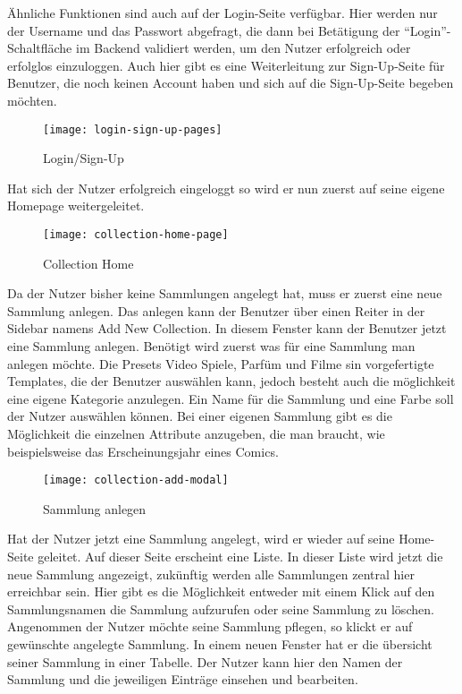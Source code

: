 Ähnliche Funktionen sind auch auf der Login-Seite verfügbar.
Hier werden nur der Username und das Passwort abgefragt, die dann bei Betätigung der “Login”-Schaltfläche im Backend validiert werden, um den Nutzer erfolgreich oder erfolglos einzuloggen.
Auch hier gibt es eine Weiterleitung zur Sign-Up-Seite für Benutzer, die noch keinen Account haben und sich auf die Sign-Up-Seite begeben möchten.

\begin{figure}[h]
    \centering
    \texttt{[image: login-sign-up-pages]}
    \caption{Login/Sign-Up}
    \label{fig:login-sign-up-pages}
\end{figure}

Hat sich der Nutzer erfolgreich eingeloggt so wird er nun zuerst auf seine eigene Homepage weitergeleitet.

\begin{figure}[h]
    \centering
    \texttt{[image: collection-home-page]}
    \caption{Collection Home}
    \label{fig:collection-home-page}
\end{figure}

Da der Nutzer bisher keine Sammlungen angelegt hat, muss er zuerst eine neue Sammlung anlegen.
Das anlegen kann der Benutzer über einen Reiter in der Sidebar namens Add New Collection.
In diesem Fenster kann der Benutzer jetzt eine Sammlung anlegen.
Benötigt wird zuerst was für eine Sammlung man anlegen möchte.
Die Presets Video Spiele, Parfüm und Filme sin vorgefertigte Templates, die der Benutzer auswählen kann, jedoch besteht auch die möglichkeit eine eigene Kategorie anzulegen.
Ein Name für die Sammlung und eine Farbe soll der Nutzer auswählen können.
Bei einer eigenen Sammlung gibt es die Möglichkeit die einzelnen Attribute anzugeben, die man braucht, wie beispielsweise das Erscheinungsjahr eines Comics.

\begin{figure}[h]
    \centering
    \texttt{[image: collection-add-modal]}
    \caption{Sammlung anlegen}
    \label{fig:collection-add-modal}
\end{figure}

Hat der Nutzer jetzt eine Sammlung angelegt, wird er wieder auf seine Home-Seite geleitet.
Auf dieser Seite erscheint eine Liste.
In dieser Liste wird jetzt die neue Sammlung angezeigt, zukünftig werden alle Sammlungen zentral hier erreichbar sein.
Hier gibt es die Möglichkeit entweder mit einem Klick auf den Sammlungsnamen die Sammlung aufzurufen oder seine Sammlung zu löschen.
Angenommen der Nutzer möchte seine Sammlung pflegen, so klickt er auf gewünschte angelegte Sammlung.
In einem neuen Fenster hat er die übersicht seiner Sammlung in einer Tabelle.
Der Nutzer kann hier den Namen der Sammlung und die jeweiligen Einträge einsehen und bearbeiten.

